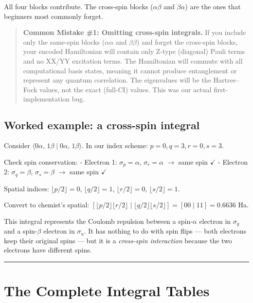 \documentclass[
  11pt,
  oneside]{book}
\begin{document}
All four blocks contribute. The cross-spin blocks (\(\alpha\beta\) and
\(\beta\alpha\)) are the ones that beginners most commonly forget.

\begin{quote}
\textbf{Common Mistake \#1: Omitting cross-spin integrals.} If you
include only the same-spin blocks (\(\alpha\alpha\) and \(\beta\beta\))
and forget the cross-spin blocks, your encoded Hamiltonian will contain
only Z-type (diagonal) Pauli terms and no XX/YY excitation terms. The
Hamiltonian will commute with all computational basis states, meaning it
cannot produce entanglement or represent any quantum correlation. The
eigenvalues will be the Hartree--Fock values, not the exact (full-CI)
values. This was our actual first-implementation bug.
\end{quote}

\subsection{Worked example: a cross-spin
integral}\label{worked-example-a-cross-spin-integral}

Consider \(\langle 0\alpha,\, 1\beta \mid 0\alpha,\, 1\beta \rangle\).
In our index scheme: \(p = 0, q = 3, r = 0, s = 3\).

Check spin conservation: - Electron 1: \(\sigma_p = \alpha\),
\(\sigma_r = \alpha\) $\rightarrow$ same spin $\checkmark$ - Electron 2: \(\sigma_q = \beta\),
\(\sigma_s = \beta\) $\rightarrow$ same spin $\checkmark$

Spatial indices: \(\lfloor p/2 \rfloor = 0\),
\(\lfloor q/2 \rfloor = 1\), \(\lfloor r/2 \rfloor = 0\),
\(\lfloor s/2 \rfloor = 1\).

Convert to chemist's spatial:
\([\lfloor p/2 \rfloor \lfloor r/2 \rfloor \mid \lfloor q/2 \rfloor \lfloor s/2 \rfloor] = [00 \mid 11] = 0.6636\)
Ha.

This integral represents the Coulomb repulsion between a spin-\(\alpha\)
electron in \(\sigma_g\) and a spin-\(\beta\) electron in \(\sigma_u\).
It has nothing to do with spin flips --- both electrons keep their
original spins --- but it is a \emph{cross-spin interaction} because the
two electrons have different spins.

\begin{center}\rule{0.5\linewidth}{0.5pt}\end{center}

\section{The Complete Integral
Tables}\label{the-complete-integral-tables}
\end{document}
